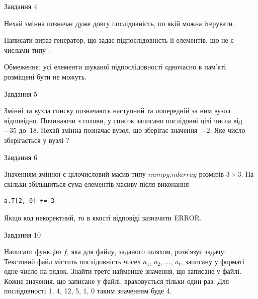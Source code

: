\documentclass[12pt, ukrainian]{article}
\begin{document}
{\begin{minipage}[t]{8.0cm}
\end{minipage}


               
{\begin{center}Завдання {4}\end{center}}
\vspace{-4mm}
Нехай змінна  позначає дуже довгу послідовність, по якій можна ітерувати.

Написати вираз-генератор, що задає підпослідовність її елементів, що не є числами типу .

Обмеження: усі елементи шуканої підпослідовності одночасно в пам'яті розміщені бути не можуть.\par

\vspace{10mm}
               
{\begin{center}Завдання {5}\end{center}}
\vspace{-4mm}
Змінні  та  вузла списку позначають наступний та попередній за ним вузол відповідно. Починаючи з голови, у список записано послідовні цілі числа від~$-35$ до~$18$. Нехай змінна  позначає вузол, що зберігає значення~$-2$.
Яке число зберігається у вузлі  ?\par

               
{\begin{center}Завдання {6}\end{center}}
\vspace{-4mm}
Значенням змінної  є цілочисловий масив типу $numpy.ndarray$ розмірів $3{\times}3$. На скільки збільшиться сума елементів масиву  після виконання
\begin{verbatim}
a.T[2, 0] += 3
\end{verbatim}


Якщо код некоректний, то в якості відповіді зазначити ERROR.\par

               
{\begin{center}Завдання {10}\end{center}}
\vspace{-4mm}

Написати функцію $f$, яка для файлу, заданого шляхом, розв’язує задачу:\\ Текстовий файл містить послідовність чисел $a_1$, $a_2$, $\ldots$, $a_t$, записану у форматі одне число на рядок. Знайти третє найменше значення, що записане у файлі. Кожне значення, що записане у файлі, враховується тільки один раз. Для послідовності 1, 4, 12, 5, 1, 0 таким значенням буде 4.

}
\end{document}
